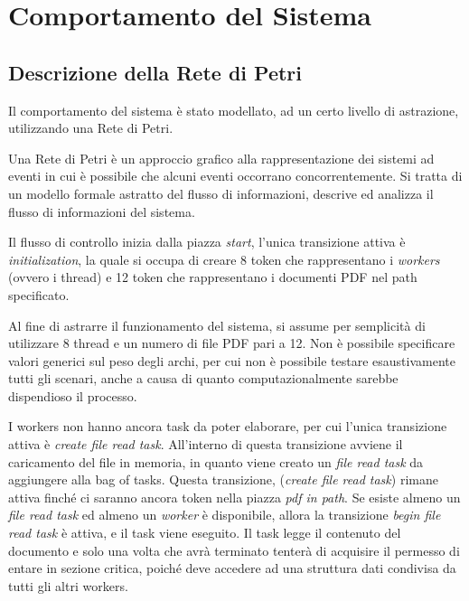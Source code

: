 \chapter{Comportamento del Sistema}
\section{Descrizione della Rete di Petri}
Il comportamento del sistema è stato modellato, ad un certo livello di astrazione, utilizzando una Rete di Petri.
\begin{question}
Una Rete di Petri è un approccio grafico alla rappresentazione dei sistemi ad eventi in cui è possibile che alcuni eventi occorrano concorrentemente. Si tratta di un modello formale astratto del flusso di informazioni, descrive ed analizza il flusso di informazioni del sistema.
\end{question}
Il flusso di controllo inizia dalla piazza \textit{start}, l'unica transizione attiva è \textit{initialization}, la quale si occupa di creare 8 token che rappresentano i \textit{workers} (ovvero i thread) e 12 token che rappresentano i documenti PDF nel path specificato.
\begin{warn}[NOTA:]
Al fine di astrarre il funzionamento del sistema, si assume per semplicità di utilizzare 8 thread e un numero di file PDF pari a 12. Non è possibile specificare valori generici sul peso degli archi, per cui non è possibile testare esaustivamente tutti gli scenari, anche a causa di quanto computazionalmente sarebbe dispendioso il processo.
\end{warn}
I workers non hanno ancora task da poter elaborare, per cui l'unica transizione attiva è \textit{create file read task}. All'interno di questa transizione avviene il caricamento del file in memoria, in quanto viene creato un \textit{file read task} da aggiungere alla bag of tasks. Questa transizione, (\textit{create file read task}) rimane attiva finché ci saranno ancora token nella piazza \textit{pdf in path}.\newline
Se esiste almeno un \textit{file read task} ed almeno un \textit{worker} è disponibile, allora la transizione \textit{begin file read task} è attiva, e il task viene eseguito. Il task legge il contenuto del documento e solo una volta che avrà terminato tenterà di acquisire il permesso di entare in sezione critica, poiché deve accedere ad una struttura dati condivisa da tutti gli altri workers.\newline
